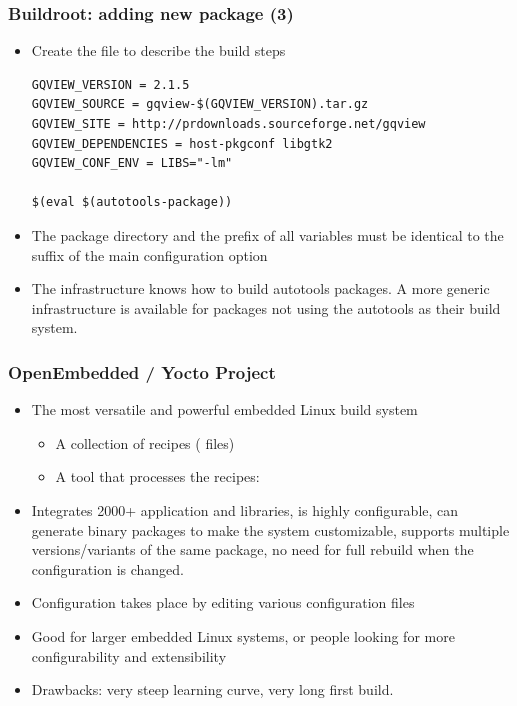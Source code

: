 \begin{frame}[fragile]
  \frametitle{Buildroot: adding new package (3)}
  \begin{itemize}
  \item Create the  file to describe the build steps
\scriptsize
\begin{block}{}
\begin{verbatim}
GQVIEW_VERSION = 2.1.5
GQVIEW_SOURCE = gqview-$(GQVIEW_VERSION).tar.gz
GQVIEW_SITE = http://prdownloads.sourceforge.net/gqview
GQVIEW_DEPENDENCIES = host-pkgconf libgtk2
GQVIEW_CONF_ENV = LIBS="-lm"

$(eval $(autotools-package))
\end{verbatim}
\end{block}
\normalsize
\item The package directory and the prefix of all variables must be
  identical to the suffix of the main configuration option
\item The  infrastructure knows how to build
  autotools packages. A more generic 
  infrastructure is available for packages not using the autotools
  as their build system.
\end{itemize}
\end{frame}

\begin{frame}
  \frametitle{OpenEmbedded / Yocto Project}
  \begin{itemize}
  \item The most versatile and powerful embedded Linux build system
    \begin{itemize}
    \item A collection of recipes ( files)
    \item A tool that processes the recipes: 
    \end{itemize}
  \item Integrates 2000+ application and libraries, is highly
    configurable, can generate binary packages to make the system
    customizable, supports multiple versions/variants of the same
    package, no need for full rebuild when the configuration is
    changed.
  \item Configuration takes place by editing various configuration
    files
  \item Good for larger embedded Linux systems, or people looking for
    more configurability and extensibility
  \item Drawbacks: very steep learning curve, very long first build.
  \end{itemize}
\end{frame}

